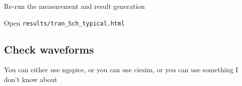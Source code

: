 \begin{Shaded}
\begin{Highlighting}[]
\KeywordTok{:}
\AttributeTok{  }\KeywordTok{:}
\AttributeTok{    }\KeywordTok{{-}}
\AttributeTok{  }\KeywordTok{:}
\AttributeTok{  }\KeywordTok{:}
\AttributeTok{  }\KeywordTok{:}\AttributeTok{ }
\AttributeTok{  }\KeywordTok{:}
\AttributeTok{  }\KeywordTok{:}\AttributeTok{ }
\AttributeTok{  }\KeywordTok{:}\AttributeTok{ }
\AttributeTok{  }\KeywordTok{:}

\KeywordTok{:}
\AttributeTok{  }\KeywordTok{:}
\AttributeTok{    }\KeywordTok{{-}}
\AttributeTok{  }\KeywordTok{:}
\AttributeTok{  }\KeywordTok{:}\AttributeTok{ }
\AttributeTok{  }\KeywordTok{:}\AttributeTok{ }
\AttributeTok{  }\KeywordTok{:}\AttributeTok{ }
\AttributeTok{  }\KeywordTok{:}\AttributeTok{ }
\AttributeTok{  }\KeywordTok{:}\AttributeTok{ }
\AttributeTok{  }\KeywordTok{:}
\end{Highlighting}
\end{Shaded}

Re-run the measurement and result generation

\begin{Shaded}
\begin{Highlighting}[]
\end{Highlighting}
\end{Shaded}

Open \texttt{results/tran\_Sch\_typical.html}

\subsection{Check waveforms}\label{check-waveforms}

You can either use ngspice, or you can use cicsim, or you can use
something I don't know about

